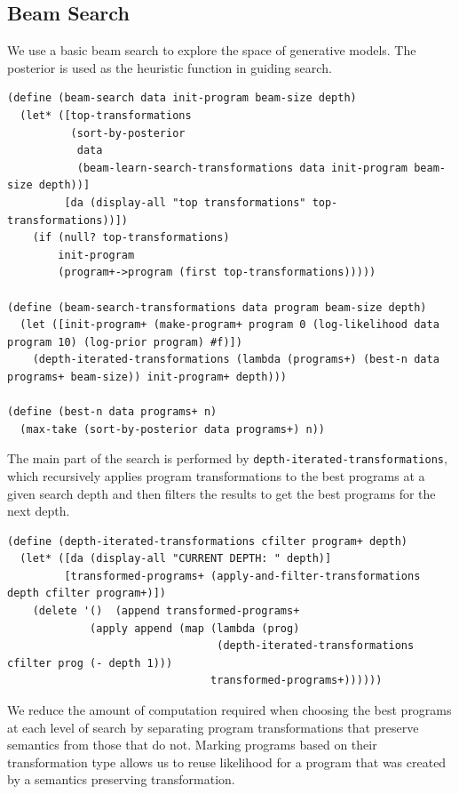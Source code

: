 \documentclass[a4paper,10pt]{article}
\begin{document}
\subsection{Beam Search}
We use a basic beam search to explore the space of generative models.  The posterior is used as the heuristic function in guiding search.
\begin{lstlisting}[frame=trBL]
(define (beam-search data init-program beam-size depth)
  (let* ([top-transformations 
          (sort-by-posterior
           data 
           (beam-learn-search-transformations data init-program beam-size depth))]
         [da (display-all "top transformations" top-transformations))])
    (if (null? top-transformations)
        init-program
        (program+->program (first top-transformations)))))

(define (beam-search-transformations data program beam-size depth)
  (let ([init-program+ (make-program+ program 0 (log-likelihood data program 10) (log-prior program) #f)])
    (depth-iterated-transformations (lambda (programs+) (best-n data programs+ beam-size)) init-program+ depth)))

(define (best-n data programs+ n)
  (max-take (sort-by-posterior data programs+) n))
\end{lstlisting}
The main part of the search is performed by \texttt{depth-iterated-transformations}, which recursively applies program transformations to the best programs at a given search depth and then filters the results to get the best programs for the next depth.
\begin{lstlisting}[frame=trBL]
(define (depth-iterated-transformations cfilter program+ depth)
  (let* ([da (display-all "CURRENT DEPTH: " depth)]
         [transformed-programs+ (apply-and-filter-transformations depth cfilter program+)])
    (delete '()  (append transformed-programs+
             (apply append (map (lambda (prog) 
                                 (depth-iterated-transformations cfilter prog (- depth 1))) 
                                transformed-programs+))))))
\end{lstlisting}
We reduce the amount of computation required when choosing the best programs at each level of search by separating program transformations that preserve semantics from those that do not.  Marking programs based on their transformation type allows us to reuse likelihood for a program that was created by a semantics preserving transformation.
\end{document}
